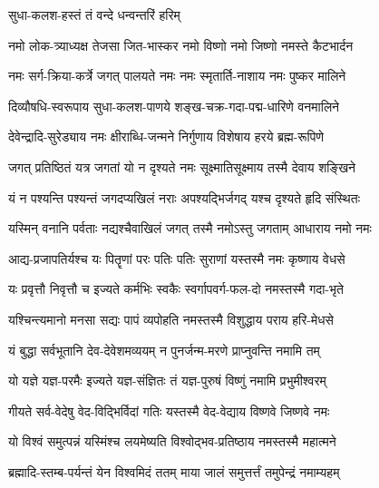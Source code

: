 

{सुधा-कलश-हस्तं तं वन्दे धन्वन्तरिं हरिम्}


\twolineshloka
{नमो लोक-त्र्याध्यक्ष तेजसा जित-भास्कर}
{नमो विष्णो नमो जिष्णो नमस्ते कैटभार्दन}%

\twolineshloka
{नमः सर्ग-क्रिया-कर्त्रे जगत् पालयते नमः}
{नमः स्मृतार्ति-नाशाय नमः पुष्कर मालिने}%

\twolineshloka
{दिव्यौषधि-स्वरूपाय सुधा-कलश-पाणये}
{शङ्ख-चक्र-गदा-पद्म-धारिणे वनमालिने}%

\twolineshloka
{देवेन्द्रादि-सुरेड्याय नमः क्षीराब्धि-जन्मने}
{निर्गुणाय विशेषाय हरये ब्रह्म-रूपिणे}%

\twolineshloka
{जगत् प्रतिष्ठितं यत्र जगतां यो न दृश्यते}
{नमः सूक्ष्मातिसूक्ष्माय तस्मै देवाय शङ्खिने}%

\twolineshloka
{यं न पश्यन्ति पश्यन्तं जगदप्यखिलं नराः}
{अपश्यद्भिर्जगद् यश्च दृश्यते हृदि संस्थितः}%

\twolineshloka
{यस्मिन् वनानि पर्वताः नद्यश्चैवाखिलं जगत्}
{तस्मै नमोऽस्तु जगताम् आधाराय नमो नमः}%

\twolineshloka
{आद्य-प्रजापतिर्यश्च यः पितॄणां परः पतिः}
{पतिः सुराणां यस्तस्मै नमः कृष्णाय वेधसे}%

\twolineshloka
{यः प्रवृत्तौ निवृत्तौ च इज्यते कर्मभिः स्वकैः}
{स्वर्गापवर्ग-फल-दो नमस्तस्मै गदा-भृते}%

\twolineshloka
{यश्चिन्त्यमानो मनसा सद्यः पापं व्यपोहति}
{नमस्तस्मै विशुद्धाय पराय हरि-मेधसे}%

\twolineshloka
{यं बुद्धा सर्वभूतानि देव-देवेशमव्ययम्}
{न पुनर्जन्म-मरणे प्राप्नुवन्ति नमामि तम्}%

\twolineshloka
{यो यज्ञे यज्ञ-परमैः इज्यते यज्ञ-संज्ञितः}
{तं यज्ञ-पुरुषं विष्णुं नमामि प्रभुमीश्वरम्}%

\twolineshloka
{गीयते सर्व-वेदेषु वेद-विद्भिर्विदां गतिः}
{यस्तस्मै वेद-वेद्याय विष्णवे जिष्णवे नमः}%

\twolineshloka
{यो विश्वं समुत्पन्नं यस्मिंश्च लयमेष्यति}
{विश्वोद्भव-प्रतिष्ठाय नमस्तस्मै महात्मने}%

\twolineshloka
{ब्रह्मादि-स्तम्ब-पर्यन्तं येन विश्वमिदं ततम्}
{माया जालं समुत्तर्त्तं तमुपेन्द्रं नमाम्यहम्}%

